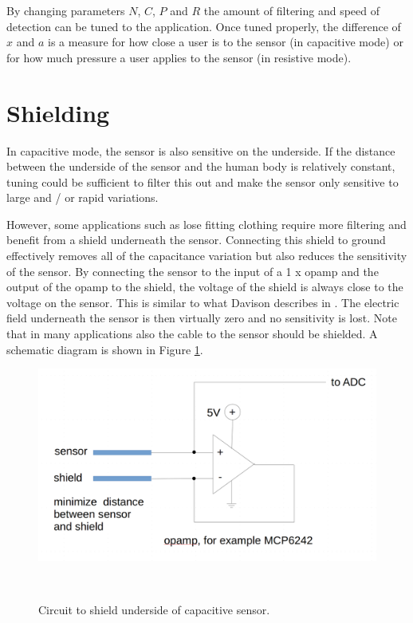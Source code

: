 \documentclass{sigchi-ext}
\begin{document}
By changing parameters $N$, $C$, $P$ and $R$ the amount of filtering and
speed of detection can be tuned to the application. Once tuned
properly, the difference of $x$ and $a$ is a measure for how close a user is to
the sensor (in capacitive mode) or for how much pressure a user applies
to the sensor (in resistive mode).

\section{Shielding}
In capacitive mode, the sensor is also sensitive on the underside. If
the distance between the underside of the sensor and the human body is
relatively constant, tuning could be sufficient to filter
this out and make the sensor only sensitive to large and / or rapid variations.

However, some applications such as lose fitting clothing require more filtering
and benefit from a shield underneath the
sensor. Connecting this shield to ground effectively removes all of the
capacitance variation but also reduces the sensitivity of the sensor. By
connecting the sensor to the input of a 1 x opamp and the output of the
opamp to the shield, the voltage of the shield is always close to the
voltage on the sensor. This is similar to what Davison describes in
\cite{Davison2013a}. The electric field underneath the sensor is then
virtually zero and no sensitivity is lost. Note that in many applications also
the cable to the sensor should be shielded. A schematic diagram
is shown in Figure \ref{fig:shield_circuit}.


\begin{figure}
\centering
\includegraphics[width=0.9\columnwidth]{figures/shield_circuit}
  \caption{Circuit to shield underside of capacitive
sensor.}~\label{fig:shield_circuit}
\end{figure}
\end{document}

